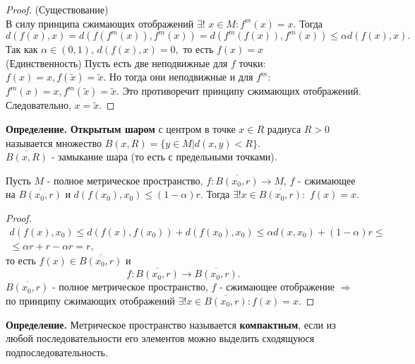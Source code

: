 \begin{proof}
    (Существование) \\
    В силу принципа сжимающих отображений $\exists!$ $x\in M:f^m(x)=x$. Тогда
    \begin{equation*}
        d(f(x),x)=d(f(f^m(x)), f^m(x))=d(f^m(f(x)), f^m(x)) \leq \alpha d(f(x), x).
    \end{equation*}
    Так как $\alpha \in (0,1)$, $d(f(x), x) = 0,$ то есть $f(x)=x$ \\
    (Единственность) Пусть есть две неподвижные для $f$ точки: $f(x) = x, f(\tilde{x}) = \tilde{x}$. Но тогда они неподвижные и для $f^m$: $f^m(x) = x, f^m(\tilde{x}) = \tilde{x}$. Это противоречит принципу
сжимающих отображений. Следовательно, $x = \tilde{x}$.
\end{proof}
\textbf{Определение.} \textbf{Открытым шаром} с центром в точке $x \in R $ радиуса $R > 0$ называется множество $B(x, R) = \{y \in M | d(x,y) < R\}$. \\
$\overline{B(x, R)}$ - замыкание шара (то есть с предельными точками).

\begin{theorem}
    Пусть $M$ - полное метрическое пространство, $f:\overline{B(x_0, r)} \rightarrow M$, $f$ - сжимающее на $\overline{B(x_0, r)}$ и $d(f(x_0), x_0) \leq (1-\alpha)r$. Тогда $\exists! x \in \overline{B(x_0, r)}: $ $f(x)=x$.
\end{theorem}
\begin{proof}
    \begin{gather*}
        d(f(x), x_0) \leq d(f(x), f(x_0)) + d(f(x_0), x_0) \leq \alpha d(x, x_0) +(1-\alpha)r \leq \\
        \leq \alpha r +r - \alpha r = r,
    \end{gather*}
    то есть $f(x) \in \overline{B(x_0, r)}$ и
    \begin{equation*}
        f:\overline{B(x_0, r)} \rightarrow \overline{B(x_0, r)}.
    \end{equation*}
    $\overline{B(x_0, r)}$ -  полное метрическое пространство, $f$ - сжимающее отображение $\Rightarrow$ по принципу сжимающих отображений $\exists! x \in \overline{B(x_0, r)}: f(x) = x.$
\end{proof}

\textbf{Определение.} Метрическое пространство называется \textbf{компактным}, если из любой последовательности его элементов можно выделить сходящуюся подпоследовательность.

